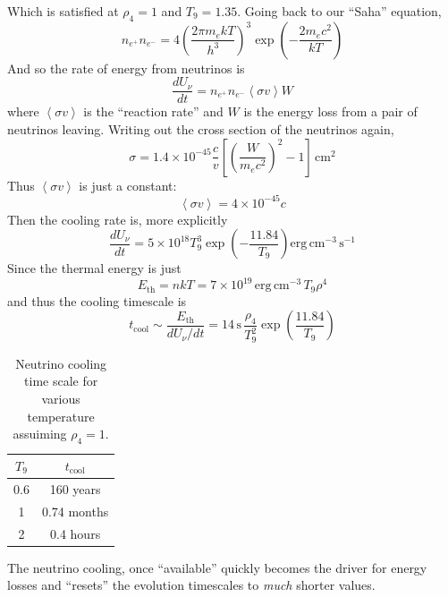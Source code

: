 \documentclass[10pt]{article}
\numberwithin{equation}{section}
\newcommand{\avg}[1]{\left\langle#1\right\rangle}
\begin{document}
    Which is satisfied at $\rho_4=1$ and $T_9=1.35$. Going back to
    our ``Saha'' equation, 
    \begin{equation}
      \label{eq:349}
      n_{e^+}n_{e^-}=4\left(\frac{2\pi m_e kT}{h^3}\right)^3\exp\left(-
\frac{2m_ec^2}{kT}\right)
    \end{equation}
    And so the rate of energy from neutrinos is
    \begin{equation}
      \label{eq:350}
      \frac{dU_\nu}{dt}=n_{e^+}n_{e^-}\avg{\sigma v}W
    \end{equation}
    where $\avg{\sigma v}$ is the ``reaction rate'' and $W$ is the
    energy loss from a pair of neutrinos leaving. Writing out the
    cross section of the neutrinos again,
    \begin{equation}
      \label{eq:351}
      \sigma = 1.4\times 10^{-45}\frac{c}{v}\left[\left(\frac{W}
{m_ec^2}\right)^2-1\right]\,\mathrm{cm^2}
    \end{equation}
    Thus $\avg{\sigma v}$ is just a constant:
    \begin{equation}
      \label{eq:352}
      \avg{\sigma v}=4\times 10^{-45}c
    \end{equation}
    Then the cooling rate is, more explicitly
    \begin{equation}
      \label{eq:353}
      \frac{dU_\nu}{dt}=5\times 10^{18}T_9^3\exp\left(-\frac{11.84}
{T_9}\right)\mathrm{erg\,cm^{-3}\,s^{-1}}
    \end{equation}
    Since the thermal energy is just
    \begin{equation}
      \label{eq:354}
      E_{\mathrm{th}}=nkT=7\times 10^{19}\,\mathrm{erg\,cm^{-3}}\,T_9\rho^4
    \end{equation}
    and thus the cooling timescale is
    \begin{equation}
      \label{eq:355}
      t_{\mathrm{cool}}\sim\frac{E_{\mathrm{th}}}{dU_\nu/dt}=14\,\mathrm{s}
\,\frac{\rho_4}{T_9^2}\exp\left(\frac{11.84}{T_9}\right)
    \end{equation}
    \begin{table}[h]
      \centering
      \begin{tabular}{c c}
        $T_9$ & $t_{\mathrm{cool}}$\\
        \hline \hline
        0.6 & 160 years\\
        1 & 0.74 months\\
        2 & 0.4 hours
      \end{tabular}
      \caption{Neutrino cooling time scale for various temperature 
assuiming $\rho_4=1$.}
      \label{tab:cooling}
    \end{table}
    The neutrino cooling, once ``available'' quickly becomes the
    driver for energy losses and ``resets'' the evolution timescales
    to \emph{much} shorter values.
\end{document}
